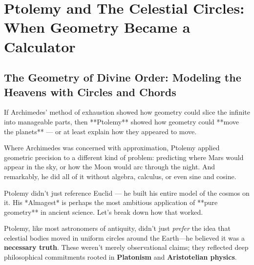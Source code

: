 \section{Ptolemy and The Celestial Circles: When Geometry Became a Calculator}

\subsection{The Geometry of Divine Order: Modeling the Heavens with Circles and Chords}

If Archimedes’ method of exhaustion showed how geometry could slice the infinite into manageable parts, then **Ptolemy** showed how geometry could **move the planets** — or at least explain how they appeared to move.

Where Archimedes was concerned with approximation, Ptolemy applied geometric precision to a different kind of problem: predicting where Mars would appear in the sky, or how the Moon would arc through the night. And remarkably, he did all of it without algebra, calculus, or even sine and cosine.

Ptolemy didn’t just reference Euclid — he built his entire model of the cosmos on it. His *Almagest* is perhaps the most ambitious application of **pure geometry** in ancient science. Let’s break down how that worked.

Ptolemy, like most astronomers of antiquity, didn’t just \emph{prefer} the idea that celestial bodies moved in uniform circles around the Earth—he believed it was a \textbf{necessary truth}. These weren’t merely observational claims; they reflected deep philosophical commitments rooted in \textbf{Platonism} and \textbf{Aristotelian physics}.

